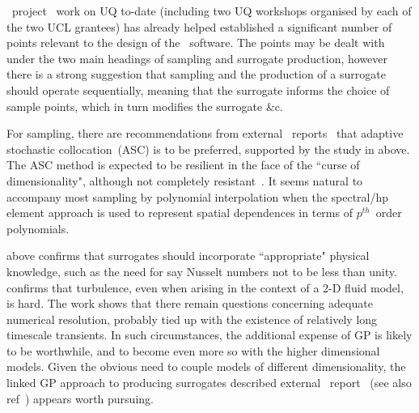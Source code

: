 \exc \ project \nep \ work on UQ to-date (including two UQ workshops organised by
each of the two UCL grantees) has already helped established a significant number of points
relevant to the design of the \nep \ software. The points may be dealt with under the two main headings
of sampling and surrogate production, however there is a strong suggestion that
sampling and the production of a surrogate should operate sequentially, meaning that the
surrogate informs the choice of sample points, which in turn modifies the surrogate \&c.

For sampling, there are recommendations from external \nep \
reports~\cite{2047352_1-TN-01} that adaptive stochastic collocation~(ASC)
is to be preferred, supported by the study in \Sec{asc} above.
The ASC method is expected to be resilient in the face of the
``curse of dimensionality", although not completely resistant~\cite{y2re241}.
It seems natural to accompany most sampling by polynomial interpolation when the spectral/hp element 
approach is used to represent spatial dependences in terms of $p^{th}$~order polynomials.

 above confirms that surrogates should incorporate
``appropriate" physical knowledge, such as the need for say Nusselt numbers not to be less than unity.
\Sec{nektar} confirms that turbulence, even when arising in the context of a  2-D fluid model,
is hard. The work shows that there remain questions concerning adequate numerical resolution, probably tied
up with the existence of relatively long timescale transients. 
In such circumstances, the additional expense of  GP is likely to be worthwhile, and to become even
more so with the higher dimensional  models. Given the obvious need to couple models
of different dimensionality, the linked GP approach to producing surrogates described
external \nep \ report~\cite{2047352_2-TN-01} (see also ref~\cite{Mi21Link})  appears worth pursuing.

